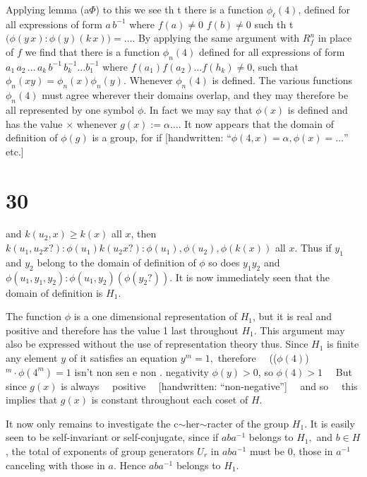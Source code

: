 \documentclass[12pt]{article}
\begin{document}
Applying lemma (a\(\Phi\)) to this we see th t there is a function
\(\phi_\ell(4)\), defined for all expressions of form \(a\,b^{-1}\) where \(f(a)\neq 0\)
\(f(b)\neq 0\) such th t \(\bigl(\phi(y\,x) : \phi(y)(k\,x)\bigr) = \ldots\).
By applying the same argument with \(R_f^n\) in place of \(f\) we find that
there is a function \(\phi_n(4)\) defined for all expressions
of form \(a_1\,a_2\,\ldots\,a_k\,b^{-1}\,b_k^{-1}\ldots b_1^{-1}\) where \(f(a_1)f(a_2)\ldots f(h_k) \neq 0\),
such that \(\phi_n(xy) = \phi_n(x)\phi_n(y)\).
Whenever \(\phi_n(4)\) is defined. The various functions \(\phi_n(4)\)
must agree wherever their domains overlap, and
they may therefore be all represented by one symbol \(\phi\). In
fact we may say that \(\phi(x)\) is defined and has the value \(\times\)
whenever \(g(x):= \alpha \ldots\). It now appears that the domain
of definition of \(\phi(g)\) is a group, for if [handwritten: ``\(\phi(4,x) = \alpha, \phi(x)=\ldots\)'' etc.]

\section{30}

\noindent
and \(k(u_2, x) \ge k(x)\) all \(x\), then \(k(u_1, u_2 x?): \phi(u_1)k(u_2 x?): \phi(u_1), \phi(u_2), \phi(k(x))\)
all \(x\). Thus if \(y_1\) and \(y_2\) belong to the domain of
definition of \(\phi\) so does \(y_1 y_2\) and \(\phi(u_1, y_1, y_2): \phi(u_1, y_2)(\phi(y_2?))\). It
is now immediately seen that the domain of definition is \(H_1\).

The function \(\phi\) is a one dimensional representation of \(H_1\),
but it is real and positive and therefore has the value 1
last throughout \(H_1\). This argument may also be expressed without the
use of representation theory thus. Since \(H_1\) is finite any
element \(y\) of it satisfies an equation \(y^m = 1,\) therefore
~~((\(\phi(4)\))\(^m \cdot \phi(4^m)=1\) isn't non sen e   non . negativity \(\phi(y)>0\), so \(\phi(4)>1\)~~
But since \(g(x)\) is always ~~positive~~ [handwritten: ``non-negative''] ~~and so~~
this implies that \(g(x)\) is constant throughout each coset of \(H\).

It now only remains to investigate the c\(\sim\)her\(\sim\)racter of the
group \(H_1\). It is easily seen to be self-invariant or self-conjugate, 
since if \(a b a^{-1}\) belongs to \(H_1,\) and \(b\in H\), 
the total of exponents of group generators \(U_r\) in \(a b a^{-1}\) must be 0, 
those in \(a^{-1}\) canceling with those in \(a\). 
Hence \(a b a^{-1}\) belongs to \(H_1\).
\end{document}
